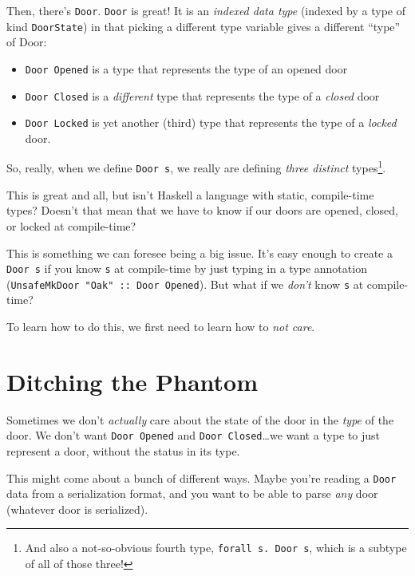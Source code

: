 \documentclass[]{article}
\begin{document}
Then, there's \texttt{Door}. \texttt{Door} is great! It is an \emph{indexed data
type} (indexed by a type of kind \texttt{DoorState}) in that picking a different
type variable gives a different ``type'' of Door:

\begin{itemize}
\tightlist
\item
  \texttt{Door\ \textquotesingle{}Opened} is a type that represents the type of
  an opened door
\item
  \texttt{Door\ \textquotesingle{}Closed} is a \emph{different} type that
  represents the type of a \emph{closed} door
\item
  \texttt{Door\ \textquotesingle{}Locked} is yet another (third) type that
  represents the type of a \emph{locked} door.
\end{itemize}

So, really, when we define \texttt{Door\ s}, we really are defining \emph{three
distinct} types\footnote{And also a not-so-obvious fourth type,
  \texttt{forall\ s.\ Door\ s}, which is a subtype of all of those three!}.

This is great and all, but isn't Haskell a language with static, compile-time
types? Doesn't that mean that we have to know if our doors are opened, closed,
or locked at compile-time?

This is something we can foresee being a big issue. It's easy enough to create a
\texttt{Door\ s} if you know \texttt{s} at compile-time by just typing in a type
annotation (\texttt{UnsafeMkDoor\ "Oak"\ ::\ Door\ \textquotesingle{}Opened}).
But what if we \emph{don't} know \texttt{s} at compile-time?

To learn how to do this, we first need to learn how to \emph{not care}.

\section{Ditching the Phantom}\label{ditching-the-phantom}

Sometimes we don't \emph{actually} care about the state of the door in the
\emph{type} of the door. We don't want \texttt{Door\ \textquotesingle{}Opened}
and \texttt{Door\ \textquotesingle{}Closed}\ldots{}we want a type to just
represent a door, without the status in its type.

This might come about a bunch of different ways. Maybe you're reading a
\texttt{Door} data from a serialization format, and you want to be able to parse
\emph{any} door (whatever door is serialized).
\end{document}
